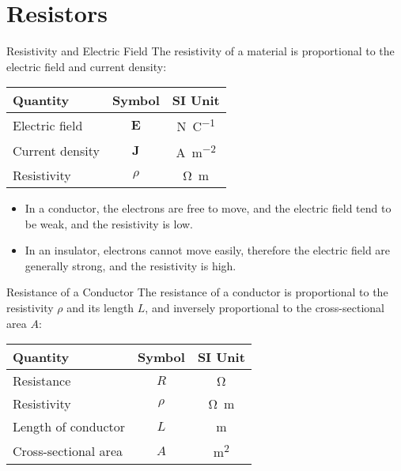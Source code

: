 \documentclass[12pt,aspectratio=169]{beamer}
\newcommand{\eq}[2]{\vspace{#1}{\Large\begin{displaymath}#2\end{displaymath}}}
\begin{document}
\section{Resistors}

\begin{frame}{Resistivity and Electric Field}
  The resistivity of a material is proportional to the electric field and
  current density:

  \eq{-.1in}{
    \boxed{\bm{E}=\rho\bm{J}}
    \quad\text{or}\quad
    \boxed{\rho=\left|\frac EJ\right|}
  }
  \begin{center}
    \begin{tabular}{l|c|c}
      \rowcolor{pink}
      \textbf{Quantity} & \textbf{Symbol} & \textbf{SI Unit} \\ \hline
      Electric field & $\bm{E}$ & \si{\newton\per\coulomb} \\
      Current density & $\bm{J}$ & \si{\ampere\per\metre\squared} \\
      Resistivity & $\rho$ & \si{\ohm.\metre}
    \end{tabular}
  \end{center}
  \begin{itemize}
  \item In a conductor, the electrons are free to move, and the electric
    field tend to be weak, and the resistivity is low.
  \item In an insulator, electrons cannot move easily, therefore the electric
    field are generally strong, and the resistivity is high.
  \end{itemize}
\end{frame}



\begin{frame}{Resistance of a Conductor}
  The resistance of a conductor is proportional to the resistivity $\rho$ and
  its length $L$, and inversely proportional to the cross-sectional area $A$:

  \eq{-.2in}{
    \boxed{R = \rho\frac LA}
  }
  \begin{center}
    \begin{tabular}{l|c|c}
      \rowcolor{pink}
      \textbf{Quantity} & \textbf{Symbol} & \textbf{SI Unit} \\ \hline
      Resistance           & $R$    & \si{\ohm} \\
      Resistivity          & $\rho$ & \si{\ohm.\metre} \\
      Length of conductor  & $L$    & \si{\metre} \\
      Cross-sectional area & $A$    & \si{\metre\squared}
    \end{tabular}
  \end{center}
\end{frame}
\end{document}
